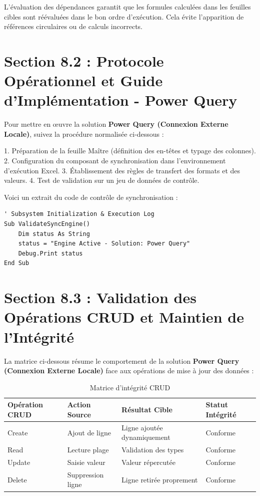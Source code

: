 \documentclass[12pt,a4paper]{report}
\begin{document}
L'évaluation des dépendances garantit que les formules calculées dans les feuilles cibles sont réévaluées dans le bon ordre d'exécution. Cela évite l'apparition de références circulaires ou de calculs incorrects.


\section{Section 8.2 : Protocole Opérationnel et Guide d'Implémentation - Power Query}
Pour mettre en œuvre la solution \textbf{Power Query (Connexion Externe Locale)}, suivez la procédure normalisée ci-dessous :

1. Préparation de la feuille Maître (définition des en-têtes et typage des colonnes).
2. Configuration du composant de synchronisation dans l'environnement d'exécution Excel.
3. Établissement des règles de transfert des formats et des valeurs.
4. Test de validation sur un jeu de données de contrôle.

Voici un extrait du code de contrôle de synchronisation :
\begin{lstlisting}[caption=Code de controle operationnel]
' Subsystem Initialization & Execution Log
Sub ValidateSyncEngine()
    Dim status As String
    status = "Engine Active - Solution: Power Query"
    Debug.Print status
End Sub
\end{lstlisting}


\section{Section 8.3 : Validation des Opérations CRUD et Maintien de l'Intégrité}
La matrice ci-dessous résume le comportement de la solution \textbf{Power Query (Connexion Externe Locale)} face aux opérations de mise à jour des données :

\begin{table}[h]
\centering
\begin{tabular}{@{}llll@{}}
\toprule
\textbf{Opération CRUD} & \textbf{Action Source} & \textbf{Résultat Cible} & \textbf{Statut Intégrité} \\ \midrule
Create & Ajout de ligne & Ligne ajoutée dynamiquement & Conforme \\
Read & Lecture plage & Validation des types & Conforme \\
Update & Saisie valeur & Valeur répercutée & Conforme \\
Delete & Suppression ligne & Ligne retirée proprement & Conforme \\ \bottomrule
\end{tabular}
\caption{Matrice d'intégrité CRUD}
\end{table}
\end{document}
